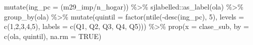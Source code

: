 \documentclass[
  12pt,
]{book}
\newenvironment{Shaded}{\begin{snugshade}}{\end{snugshade}}
\newcommand{\AttributeTok}[1]{\textcolor[rgb]{0.77,0.63,0.00}{#1}}
\newcommand{\ConstantTok}[1]{\textcolor[rgb]{0.00,0.00,0.00}{#1}}
\newcommand{\DecValTok}[1]{\textcolor[rgb]{0.00,0.00,0.81}{#1}}
\newcommand{\FunctionTok}[1]{\textcolor[rgb]{0.00,0.00,0.00}{#1}}
\newcommand{\NormalTok}[1]{#1}
\newcommand{\SpecialCharTok}[1]{\textcolor[rgb]{0.00,0.00,0.00}{#1}}
\newcommand{\StringTok}[1]{\textcolor[rgb]{0.31,0.60,0.02}{#1}}
\begin{document}
\begin{Shaded}
\begin{Highlighting}[]
  \FunctionTok{mutate}\NormalTok{(}\AttributeTok{ing\_pc =}\NormalTok{ (m29\_imp}\SpecialCharTok{/}\NormalTok{n\_hogar)) }\SpecialCharTok{\%\textgreater{}\%}
\NormalTok{  sjlabelled}\SpecialCharTok{::}\FunctionTok{as\_label}\NormalTok{(ola) }\SpecialCharTok{\%\textgreater{}\%} 
  \FunctionTok{group\_by}\NormalTok{(ola) }\SpecialCharTok{\%\textgreater{}\%} 
  \FunctionTok{mutate}\NormalTok{(}\AttributeTok{quintil =} \FunctionTok{factor}\NormalTok{(}\FunctionTok{ntile}\NormalTok{(}\SpecialCharTok{{-}}\FunctionTok{desc}\NormalTok{(ing\_pc), }\DecValTok{5}\NormalTok{), }\AttributeTok{levels =} \FunctionTok{c}\NormalTok{(}\DecValTok{1}\NormalTok{,}\DecValTok{2}\NormalTok{,}\DecValTok{3}\NormalTok{,}\DecValTok{4}\NormalTok{,}\DecValTok{5}\NormalTok{),}
         \AttributeTok{labels =} \FunctionTok{c}\NormalTok{(}\StringTok{\textquotesingle{}Q1\textquotesingle{}}\NormalTok{, }\StringTok{\textquotesingle{}Q2\textquotesingle{}}\NormalTok{, }\StringTok{\textquotesingle{}Q3\textquotesingle{}}\NormalTok{, }\StringTok{\textquotesingle{}Q4\textquotesingle{}}\NormalTok{, }\StringTok{\textquotesingle{}Q5\textquotesingle{}}\NormalTok{))) }\SpecialCharTok{\%\textgreater{}\%} 
  \FunctionTok{prop}\NormalTok{(}\AttributeTok{x =}\NormalTok{ clase\_sub, }\AttributeTok{by =} \FunctionTok{c}\NormalTok{(ola, quintil), }\AttributeTok{na.rm =} \ConstantTok{TRUE}\NormalTok{)}


\end{Highlighting}
\end{Shaded}
\end{document}
